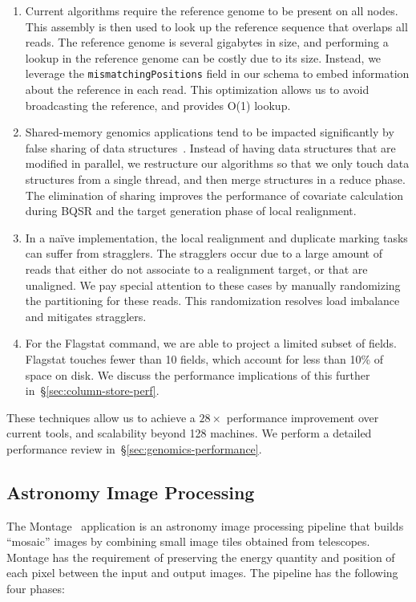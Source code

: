 \documentclass{sig-alternate}
\begin{document}
\begin{enumerate}
\item Current algorithms require the reference genome to be present on all nodes. This assembly is then used to
look up the reference sequence that overlaps all reads. The reference genome is several gigabytes in
size, and performing a lookup in the reference genome can be costly due to its size. Instead, we leverage
the \texttt{mismatchingPositions} field in our schema to embed information about the reference in each read. This
optimization allows us to avoid broadcasting the reference, and provides O(1) lookup.
\item Shared-memory genomics applications tend to be impacted significantly by false sharing of data
\linebreak structures~\cite{zaharia11}. Instead of having data structures that are modified in parallel, we
restructure our algorithms so that we only touch data structures from a single thread, and then merge
structures in a reduce phase. The elimination of sharing improves the performance of covariate calculation during
BQSR and the target generation phase of local realignment.
\item In a na\"{i}ve implementation, the local realignment and duplicate marking tasks can suffer from
stragglers. The stragglers occur due to a large amount of reads that either do not associate to a realignment
target, or that are unaligned. We pay special attention to these cases by manually randomizing the
partitioning for these reads. This randomization resolves load imbalance and mitigates stragglers.
\item For the Flagstat command, we are able to project a limited subset of fields. Flagstat touches fewer
than 10 fields, which account for less than 10\% of space on disk. We discuss the performance
implications of this further in~\S\ref{sec:column-store-perf}.
\end{enumerate}

These techniques allow us to achieve a $28\times$ performance improvement over current
tools, and scalability beyond 128 machines. We perform a detailed performance review
in~\S\ref{sec:genomics-performance}.

\subsection{Astronomy Image Processing}
\label{sec:astronomy-image-processing}

The Montage~\cite{montage} application is an astronomy image processing pipeline that builds ``mosaic'' images
by combining small image tiles obtained from telescopes. Montage has the requirement of preserving the energy
quantity and position of each pixel between the input and output images. The pipeline has the following four
phases:
\end{document}
